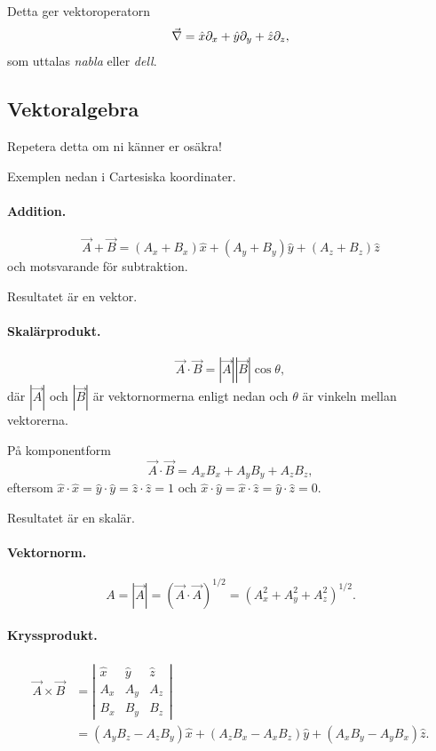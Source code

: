 \documentclass[%
oneside,                 %
final,                   %
10pt]{article}
\begin{document}
Detta ger vektoroperatorn
\begin{equation}
\vec{\nabla} = \hat{x} \partial_x + \hat{y} \partial_y + \hat{z} \partial_z,
\end{equation}
som uttalas \emph{nabla} eller \emph{dell}.

\subsection*{Vektoralgebra}

Repetera detta om ni känner er osäkra!

Exemplen nedan i Cartesiska koordinater.

\paragraph{Addition.}
\begin{equation}
\vec{A}+\vec{B} = (A_x + B_x) \hat{x} + (A_y + B_y) \hat{y} + (A_z + B_z) \hat{z}
\end{equation}
och motsvarande för subtraktion. 

Resultatet är en vektor.

\paragraph{Skalärprodukt.}
\begin{equation}
\vec{A} \cdot \vec{B} = |\vec{A}| |\vec{B}| \cos\theta,
\end{equation}
där $|\vec{A}|$ och $|\vec{B}|$ är vektornormerna enligt nedan och $\theta$ är vinkeln mellan vektorerna.

På komponentform
\begin{equation}
\vec{A} \cdot \vec{B} = A_x B_x + A_y B_y + A_z B_z,
\end{equation}
eftersom $\hat{x} \cdot \hat{x} = \hat{y} \cdot \hat{y} = \hat{z} \cdot \hat{z} = 1$ och $\hat{x} \cdot \hat{y} = \hat{x} \cdot \hat{z} = \hat{y} \cdot \hat{z} = 0$.

Resultatet är en skalär.

\paragraph{Vektornorm.}
\begin{equation}
A = |\vec{A}| = (\vec{A} \cdot \vec{A})^{1/2} = (A_x^2 + A_y^2 + A_z^2)^{1/2}.
\end{equation}

\paragraph{Kryssprodukt.}
\begin{align}
\vec{A} \times \vec{B} & = \left| 
\begin{array}{ccc}
\hat{x} & \hat{y} & \hat{z} \\ 
A_x & A_y & A_z \\ 
B_x & B_y & B_z
\end{array}
\right| \\ 
& = (A_y B_z - A_z B_y)\hat{x} + (A_z B_x - A_x B_z)\hat{y} + (A_x B_y - A_y B_x) \hat{z}.
\end{align}
\end{document}
